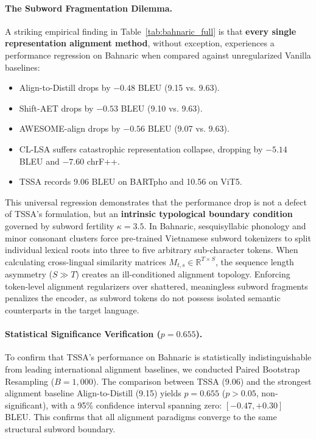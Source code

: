 \documentclass[11pt]{article}
\begin{document}
\paragraph{The Subword Fragmentation Dilemma.}
A striking empirical finding in Table~\ref{tab:bahnaric_full} is that \textbf{every single representation alignment method}, without exception, experiences a performance regression on Bahnaric when compared against unregularized Vanilla baselines:
\begin{itemize}[leftmargin=*]
    \item Align-to-Distill drops by $-0.48$ BLEU (9.15 vs. 9.63).
    \item Shift-AET drops by $-0.53$ BLEU (9.10 vs. 9.63).
    \item AWESOME-align drops by $-0.56$ BLEU (9.07 vs. 9.63).
    \item CL-LSA suffers catastrophic representation collapse, dropping by $-5.14$ BLEU and $-7.60$ chrF++.
    \item TSSA records 9.06 BLEU on BARTpho and 10.56 on ViT5.
\end{itemize}

This universal regression demonstrates that the performance drop is not a defect of TSSA's formulation, but an \textbf{intrinsic typological boundary condition} governed by subword fertility $\kappa = 3.5$. In Bahnaric, sesquisyllabic phonology and minor consonant clusters force pre-trained Vietnamese subword tokenizers to split individual lexical roots into three to five arbitrary sub-character tokens. When calculating cross-lingual similarity matrices $M_{t,s} \in \mathbb{R}^{T \times S}$, the sequence length asymmetry ($S \gg T$) creates an ill-conditioned alignment topology. Enforcing token-level alignment regularizers over shattered, meaningless subword fragments penalizes the encoder, as subword tokens do not possess isolated semantic counterparts in the target language.

\paragraph{Statistical Significance Verification ($p = 0.655$).}
To confirm that TSSA's performance on Bahnaric is statistically indistinguishable from leading international alignment baselines, we conducted Paired Bootstrap Resampling ($B=1,000$). The comparison between TSSA (9.06) and the strongest alignment baseline Align-to-Distill (9.15) yields $p = 0.655$ ($p > 0.05$, non-significant), with a 95\% confidence interval spanning zero: $[-0.47, +0.30]$ BLEU. This confirms that all alignment paradigms converge to the same structural subword boundary.
\end{document}

